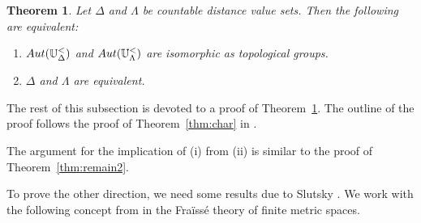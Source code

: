 \documentclass{amsart}
\newtheorem{theorem}{Theorem}[section]
\newtheorem{corollary}[theorem]{Corollary}
\theoremstyle{definition}
\theoremstyle{remark}
\begin{document}
    \begin{theorem}\label{thm:class}
        Let $\Delta$ and $\Lambda$ be countable distance value sets. Then the following are equivalent: 
        \begin{enumerate}
            \item[\rm (i)] ${\rm Aut}(\mathbb{U}_\Delta^<)$ and ${\rm Aut}(\mathbb{U}_\Lambda^<)$ are isomorphic as topological groups. 
            \item[\rm (ii)] $\Delta$ and $\Lambda$ are equivalent. 
        \end{enumerate}
    \end{theorem}

The rest of this subsection is devoted to a proof of Theorem~\ref{thm:class}. The outline of the proof follows the proof of Theorem~\ref{thm:char} in \cite{EGLMM}. 


The argument for the implication of (i) from (ii) is similar to the proof of Theorem~\ref{thm:remain2}. 

To prove the other direction, we need some results due to Slutsky \cite{Slutsky}. We work with the following concept from \cite{Slutsky} in the Fra\"iss\'e theory of finite metric spaces. 
\end{document}
